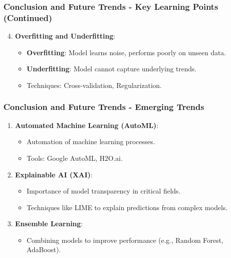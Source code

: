\documentclass{beamer}
\begin{document}
\begin{frame}[fragile]
    \frametitle{Conclusion and Future Trends - Key Learning Points (Continued)}
    
    \begin{enumerate}
        \setcounter{enumi}{3}
        \item \textbf{Overfitting and Underfitting}:
            \begin{itemize}
                \item \textbf{Overfitting}: Model learns noise, performs poorly on unseen data.
                \item \textbf{Underfitting}: Model cannot capture underlying trends.
                \item Techniques: Cross-validation, Regularization.
            \end{itemize}
    \end{enumerate}
\end{frame}

\begin{frame}[fragile]
    \frametitle{Conclusion and Future Trends - Emerging Trends}
    
    \begin{enumerate}
        \item \textbf{Automated Machine Learning (AutoML)}:
            \begin{itemize}
                \item Automation of machine learning processes.
                \item Tools: Google AutoML, H2O.ai.
            \end{itemize}
        
        \item \textbf{Explainable AI (XAI)}:
            \begin{itemize}
                \item Importance of model transparency in critical fields.
                \item Techniques like LIME to explain predictions from complex models.
            \end{itemize}
        
        \item \textbf{Ensemble Learning}:
            \begin{itemize}
                \item Combining models to improve performance (e.g., Random Forest, AdaBoost).
            \end{itemize}
    \end{enumerate}
\end{frame}
\end{document}
